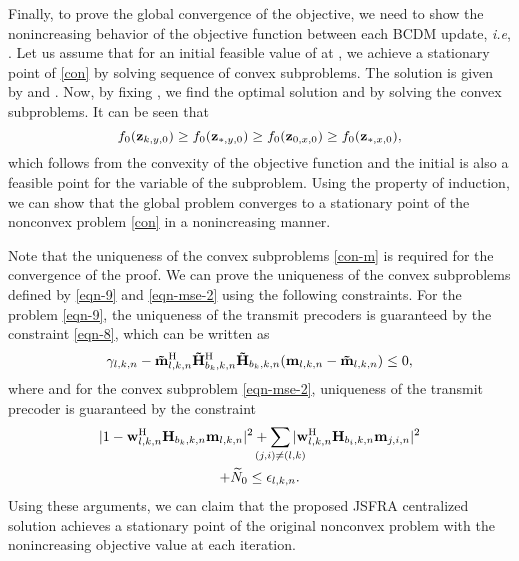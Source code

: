 Finally, to prove the global convergence of the objective, we need to show the nonincreasing behavior of the objective function between each \ac{BCDM} update, \textit{i.e}, . Let us assume that for an initial feasible value of \eqn{\my} at , we achieve a stationary point of \eqref{con} by solving sequence of convex subproblems. The solution is given by  and \eqn{\mx_{\ast}}. Now, by fixing , we find the optimal solution  and \eqn{\my_{\ast}} by solving the convex subproblems. It can be seen that 
\begin{equation}
f_0(\mathbf{z}_{k,y,0}) \geq f_0(\mathbf{z}_{\ast,y,0}) \geq f_0(\mathbf{z}_{0,x,0}) \geq f_0(\mathbf{z}_{\ast,x,0}),
\end{equation}
which follows from the convexity of the objective function  and the initial  is also a feasible point for the variable \eqn{\my} of the  subproblem. Using the property of induction, we can show that the global problem converges to a stationary point of the nonconvex problem \eqref{con} in a nonincreasing manner.

Note that the uniqueness of the convex subproblems \eqref{con-m} is required for the convergence of the proof. We can prove the uniqueness of the convex subproblems defined by \eqref{eqn-9} and \eqref{eqn-mse-2} using the following constraints. For the problem \eqref{eqn-9}, the uniqueness of the transmit precoders is guaranteed by the constraint \eqref{eqn-8}, which can be written as
\begin{equation}
\gamma_{l,k,n} - \mathbf{\tilde{m}}_{l,k,n}^{\mathrm{H}} \mathbf{\tilde{H}}_{b_k,k,n}^{\mathrm{H}} \mathbf{\tilde{H}}_{b_k,k,n} (\mathbf{m}_{l,k,n} - \mathbf{\tilde{m}}_{l,k,n}) \leq 0,
\end{equation}
where  and for the convex subproblem \eqref{eqn-mse-2}, uniqueness of the transmit precoder is guaranteed by the constraint 
\begin{multline}
| 1 - \mvec{w}{l,k,n}^\herm \mvec{H}{b_k,k,n} \mvec{m}{l,k,n} |^2 + \sum_{\mathclap{(j,i) \neq (l,k)}} | \mvec{w}{l,k,n}^\herm \mvec{H}{b_i,k,n} \mvec{m}{j,i,n} |^2 \\ + \enoise \leq \epsilon_{l,k,n}.
\end{multline}
Using these arguments, we can claim that the proposed \ac{JSFRA} centralized solution achieves a stationary point of the original nonconvex problem with the nonincreasing objective value at each iteration. 










